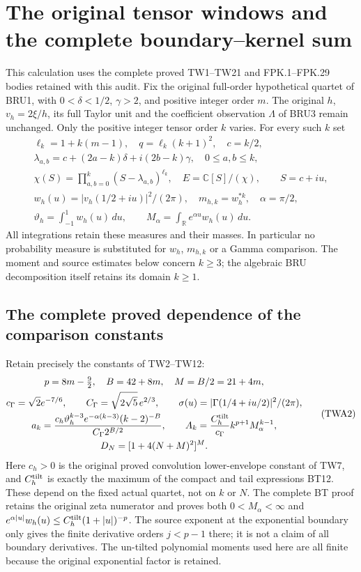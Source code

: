 \section{The original tensor windows and the complete boundary--kernel sum}
\label{sec:twa-original-tensor-windows}

This calculation uses the complete proved TW1--TW21 and FPK.1--FPK.29
bodies retained with this audit. Fix the original full-order hypothetical
quartet of BRU1, with $0<\delta<1/2$, $\gamma>2$, and positive integer
order $m$. The original $h$, $v_h=2\xi/h$, its full Taylor unit and
the coefficient observation $\Lambda$ of BRU3 remain unchanged.
Only the positive integer tensor order $k$ varies. For every such $k$ set
\[
\begin{gathered}
\ell_k=1+k(m-1),\quad q=\ell_k(k+1)^2,\quad c=k/2,\\
\lambda_{a,b}=c+(2a-k)\delta+i(2b-k)\gamma,
\quad 0\le a,b\le k,\\
\chi(S)=\prod_{a,b=0}^k(S-\lambda_{a,b})^{\ell_k},
\quad E=\mathbb C[S]/(\chi),\qquad S=c+iu,\\
w_h(u)=|v_h(1/2+iu)|^2/(2\pi),\quad
m_{h,k}=w_h^{*k},\quad \alpha=\pi/2,\\
\vartheta_h=\int_{-1}^1w_h(u)\,du,\qquad
M_\alpha=\int_{\mathbb R}e^{\alpha u}w_h(u)\,du.
\end{gathered}\tag{TWA1}
\]
All integrations retain these measures and their masses. In particular
no probability measure is substituted for $w_h$, $m_{h,k}$ or a Gamma
comparison. The moment and source estimates below concern $k\ge3$;
the algebraic BRU decomposition itself retains its domain $k\ge1$.

\subsection{The complete proved dependence of the comparison constants}

Retain precisely the constants of TW2--TW12:
\[
\begin{gathered}
p=8m-\tfrac92,\quad B=42+8m,\quad M=B/2=21+4m,\\
c_\Gamma=\sqrt2e^{-7/6},\qquad
C_\Gamma=\sqrt{2\sqrt5}\,e^{2/3},\qquad
\sigma(u)=|\Gamma(1/4+iu/2)|^2/(2\pi),\\
a_k=\frac{c_h\vartheta_h^{k-3}e^{-\alpha(k-3)}(k-2)^{-B}}
{C_\Gamma2^{B/2}},\qquad
A_k=\frac{C_h^{\rm tilt}}{c_\Gamma}k^{p+1}M_\alpha^{k-1},\\
D_N=[1+4(N+M)^2]^M.
\end{gathered}\tag{TWA2}
\]
Here $c_h>0$ is the original proved convolution lower-envelope
constant of TW7, and $C_h^{\rm tilt}$ is exactly the maximum of the
compact and tail expressions BT12. These depend on the fixed actual
quartet, not on $k$ or $N$. The complete BT proof retains the original
zeta numerator and proves both $0<M_\alpha<\infty$ and
$e^{\alpha|u|}w_h(u)\le C_h^{\rm tilt}(1+|u|)^{-p}$.
The source exponent at the exponential boundary only gives the
finite derivative orders $j<p-1$ there; it is not a claim of all
boundary derivatives. The un-tilted polynomial moments used here are
all finite because the original exponential factor is retained.

